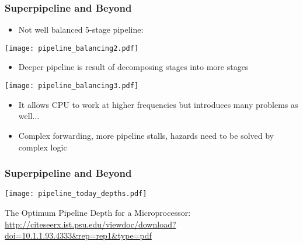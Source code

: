 \documentclass{beamer}
\begin{document}
\begin{frame}
\frametitle{Superpipeline and Beyond}

\begin{itemize}
 \item Not well balanced 5-stage pipeline:
\end{itemize}

\texttt{[image: pipeline\_balancing2.pdf]}

\begin{itemize}
 \item Deeper pipeline is result of decomposing stages into more stages
\end{itemize}

\texttt{[image: pipeline\_balancing3.pdf]}

\begin{itemize}
 \item It allows CPU to work at higher frequencies but introduces many problems as well...
 \item Complex forwarding, more pipeline stalls, hazards need to be solved by complex logic
\end{itemize}

\end{frame}

\begin{frame}
\frametitle{Superpipeline and Beyond}

\texttt{[image: pipeline\_today\_depths.pdf]}

The Optimum Pipeline Depth for a Microprocessor: {\tiny \url{http://citeseerx.ist.psu.edu/viewdoc/download?doi=10.1.1.93.4333\&rep=rep1\&type=pdf}}

\end{frame}
\end{document}
